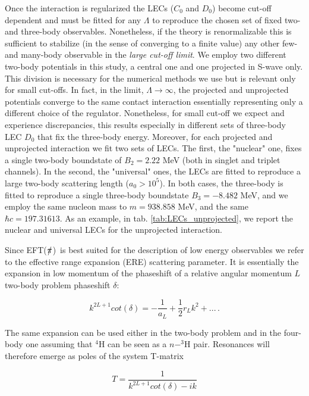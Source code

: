 \documentclass[aps,onecolumn,preprintnumbers,amsmath,amssymb,nofootinbib,superscriptaddress,notitlepage]{revtex4-1}
\newcommand{\eftnopi}{\mbox{EFT($\slashed{\pi}$) }}
\begin{document}
Once the interaction is regularized the LECs ($C_0$ and $D_0$) become cut-off dependent and must be fitted for any $\Lambda$ to reproduce the chosen set of fixed two- and three-body observables.
Nonetheless, if the theory is renormalizable this is sufficient to stabilize (in the sense of converging to a finite value) any other few- and many-body observable in the \textit{large cut-off limit}.
We employ two different two-body potentials in this study, a central one and one projected in S-wave only. 
This division is necessary for the numerical methods we use but is relevant only for small cut-offs.
In fact, in the limit, $\Lambda\rightarrow\infty$, the projected and unprojected potentials converge to the same contact interaction essentially representing only a different choice of the regulator.
Nonetheless, for small cut-off we expect and experience discrepancies, this results especially in different sets of three-body LEC $D_0$ that fix the three-body energy.
Moreover, for each projected and unprojected interaction we fit two sets of LECs.
The first, the "nuclear" one, fixes a single two-body boundstate of $B_2=2.22$ MeV (both in singlet and triplet channels).
In the second, the "universal" ones, the LECs are fitted to reproduce a large two-body scattering length ($a_0>10^5$).
In both cases, the three-body is fitted to reproduce a single three-body boundstate $B_3=-8.482$ MeV, and we employ the same nucleon mass to $m=938.858$ MeV, and the same $\hbar c= 197.31613$.
As an example, in tab. \ref{tab:LECs_unprojected}, we report the nuclear and universal LECs for the unprojected interaction.
%

%
Since \eftnopi is best suited for the description of low energy observables we refer to the effective range expansion (ERE) scattering parameter. 
It is essentially the expansion in low momentum of the phaseshift of a relative angular momentum $L$ two-body problem phaseshift $\delta$:

\begin{equation}
    k^{2L+1}cot(\delta)=-\frac{1}{a_L}+\frac{1}{2}r_L k^2 + ... \, .
\end{equation}

The same expansion can be used either in the two-body problem and in the four-body one assuming that $^4$H can be seen as a $n-^3$H pair.
Resonances will therefore emerge as poles of the system T-matrix

\begin{equation}
T = \frac{1}{k^{2L+1}cot(\delta)-ik}    
\end{equation}
\end{document}
